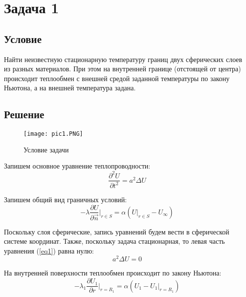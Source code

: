 \section{Задача 1}

\subsection{Условие}

Найти неизвестную стационарную температуру границ двух сферических слоев из разных материалов. При этом на внутренней границе (отстоящей от центра) происходит теплообмен с внешней средой заданной температуры по закону Ньютона, а на внешней температура задана.

\subsection{Решение}

\begin{figure}[H]
    \begin{center}
        \texttt{[image: pic1.PNG]}
        \caption{Условие задачи}
        \label{pic1}
    \end{center}
\end{figure}

Запишем основное уравнение теплопроводности:
\begin{equation}
    \label{eq1}
    \frac{\partial^2 U}{\partial t^2} = a^2 \Delta U
\end{equation}

Запишем общий вид граничных условий:
\begin{equation}
    \label{eq2}
    - \lambda \frac{\partial U}{\partial \vec{n}} \Big|_{r \in S} = \alpha \left( U \Big|_{r \in S} - U_\infty \right)
\end{equation}

Поскольку слоя сферические, запись уравнений будем вести в сферической системе координат. Также, поскольку задача стационарная, то левая часть уравнения (\ref{eq1}) равна нулю:
\begin{equation}
    \label{eq2.1}
    a^2 \Delta U = 0
\end{equation}

На внутренней поверхности теплообмен происходит по закону Ньютона:
\begin{equation}
    \label{eq3}
    - \lambda_1 \frac{\partial U_1}{\partial r} \Big|_{r = R_1} = \alpha (U_1 - U_1\Big|_{r = R_1})
\end{equation}

